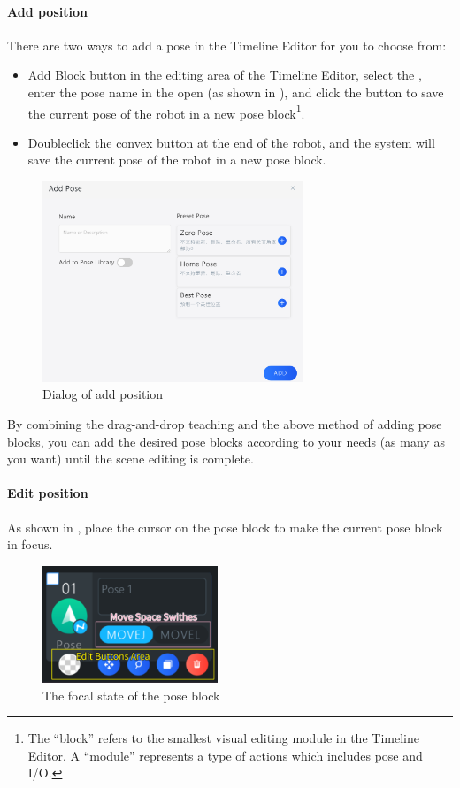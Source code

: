 \paragraph{Add position}
There are two ways to add a pose in the Timeline Editor for you to choose from:
\begin{itemize}
	\item Add Block button  in the editing area of the Timeline Editor, select the , enter the pose name in the open  (as shown in ), and click the button to save the current pose of the robot in a new pose block\footnote{The ``block'' refers to the smallest visual editing module in the Timeline Editor. A ``module'' represents a type of actions which includes pose and I/O.}.
	\item Double­click the convex button at the end of the robot, and the system will save the current pose of the robot in a new pose block.
\end{itemize}

\begin{figure}[ht]
	\centering
	\includegraphics[height=6cm]{en/image/3-6.png}
	\caption{Dialog of add position}
	\label{fig:添加位置对话框}
\end{figure}

By combining the drag-and-drop teaching and the above method of adding pose blocks, you can add the desired pose blocks according to your needs (as many as you want) until the scene editing is complete.

\paragraph{Edit position}
\label{sec:编辑位置}
As shown in , place the cursor on the pose block to make the current pose block in focus.

\begin{figure}[ht]
	\centering
	\includegraphics[height=3.5cm]{en/image/pose-block.png}
	\caption{The focal state of the pose block}
	\label{fig:位置块焦点状态}
\end{figure}

